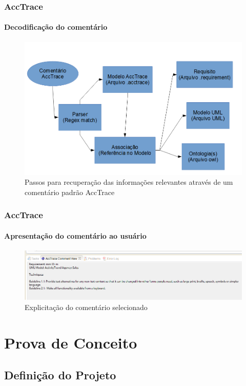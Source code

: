 \documentclass{beamer}
\begin{document}
\begin{frame}
\frametitle{AccTrace}
\framesubtitle{Decodificação do comentário}

\begin{figure}[htbp] \centering
	\includegraphics[width=\textwidth,height=.65\textheight,keepaspectratio]{./img/commentrecovery.png}
	\caption{Passos para recuperação das informações relevantes através de um comentário padrão AccTrace}
	\label{fig:commentrecovery}
\end{figure}

\end{frame}

\begin{frame}
\frametitle{AccTrace}
\framesubtitle{Apresentação do comentário ao usuário}

\begin{figure}[htbp] \centering
	\includegraphics[width=\textwidth,height=.65\textheight,keepaspectratio]{./img/commentview.png}
	\caption{Explicitação do comentário selecionado}
	\label{fig:commentview}
\end{figure}

\end{frame}

\section{Prova de Conceito}

\subsection[Definição do Projeto]{Definição do Projeto}
\end{document}
